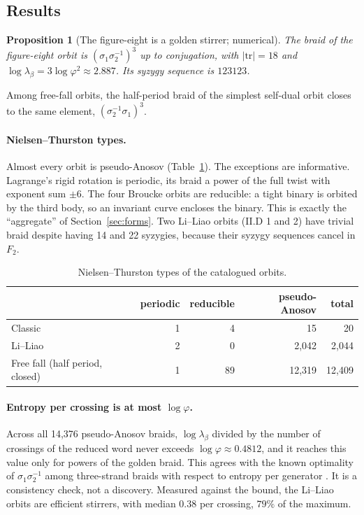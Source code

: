\documentclass[11pt]{article}
\newtheorem{proposition}{Proposition}
\theoremstyle{remark}
\begin{document}
\subsection{Results}

\begin{proposition}[The figure-eight is a golden stirrer; numerical]
\label{prop:fig8}
The braid of the figure-eight orbit is $(\sigma_1\sigma_2^{-1})^3$ up to conjugation, with $|\mathrm{tr}|=18$
and $\log\lambda_\beta=3\log\varphi^2\approx2.887$. Its syzygy sequence is $123123$.
\end{proposition}
\noindent Among free-fall orbits, the half-period braid of the simplest self-dual orbit closes to the same
element, $(\sigma_2^{-1}\sigma_1)^3$.

\paragraph{Nielsen--Thurston types.} Almost every orbit is pseudo-Anosov
(Table~\ref{tab:types}). The exceptions are informative. Lagrange's rigid rotation is periodic, its braid a
power of the full twist with exponent sum $\pm6$. The four Broucke orbits are reducible: a tight binary is
orbited by the third body, so an invariant curve encloses the binary. This is exactly the ``aggregate'' of
Section~\ref{sec:forms}. Two Li--Liao orbits (II.D 1 and 2) have trivial braid despite having 14 and 22
syzygies, because their syzygy sequences cancel in $F_2$.

\begin{table}[h]
\centering
\begin{tabular}{@{}lrrrr@{}}
\toprule
 & periodic & reducible & pseudo-Anosov & total\\
\midrule
Classic & 1 & 4 & 15 & 20\\
Li--Liao & 2 & 0 & 2{,}042 & 2{,}044\\
Free fall (half period, closed) & 1 & 89 & 12{,}319 & 12{,}409\\
\bottomrule
\end{tabular}
\caption{Nielsen--Thurston types of the catalogued orbits.}
\label{tab:types}
\end{table}

\paragraph{Entropy per crossing is at most $\log\varphi$.} Across all 14{,}376 pseudo-Anosov braids,
$\log\lambda_\beta$ divided by the number of crossings of the reduced word never exceeds
$\log\varphi\approx0.4812$, and it reaches this value only for powers of the golden braid. This agrees with the
known optimality of $\sigma_1\sigma_2^{-1}$ among three-strand braids with respect to entropy per generator
\cite{DAlessandro1999,FinnThiffeault2011}. It is a consistency check, not a discovery. Measured against the
bound, the Li--Liao orbits are efficient stirrers, with median $0.38$ per crossing, $79\%$ of the maximum.
\end{document}
